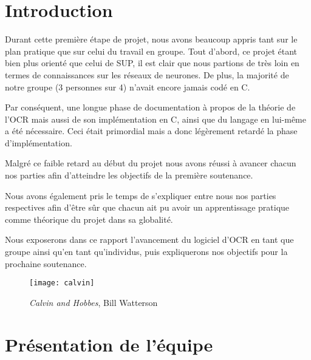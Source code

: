 \chapter{Introduction}

Durant cette première étape de projet, nous avons beaucoup appris tant sur le
plan pratique que sur celui du travail en groupe. Tout d'abord, ce projet étant
bien plus orienté que celui de SUP, il est clair que nous partions de très loin
en termes de connaissances sur les réseaux de neurones. De plus, la majorité de
notre groupe (3 personnes sur 4) n'avait encore jamais codé en C.

Par conséquent, une longue phase de documentation à propos de la théorie de
l'OCR mais aussi de son implémentation en C, ainsi que du langage en lui-même a
été nécessaire. Ceci était primordial mais a donc légèrement retardé la phase
d'implémentation.

Malgré ce faible retard au début du projet nous avons réussi à avancer chacun
nos parties afin d'atteindre les objectifs de la première soutenance.

Nous avons également pris le temps de s'expliquer entre nous nos parties
respectives afin d'être sûr que chacun ait pu avoir un apprentissage pratique
comme théorique du projet dans sa globalité.

Nous exposerons dans ce rapport l'avancement du logiciel d'OCR en tant que
groupe ainsi qu'en tant qu'individus, puis expliquerons nos objectifs pour la
prochaine soutenance.

\begin{figure}
    \texttt{[image: calvin]}
    \caption*{\textit{Calvin and Hobbes}, Bill Watterson}
\end{figure}

\chapter{Présentation de l'équipe}

